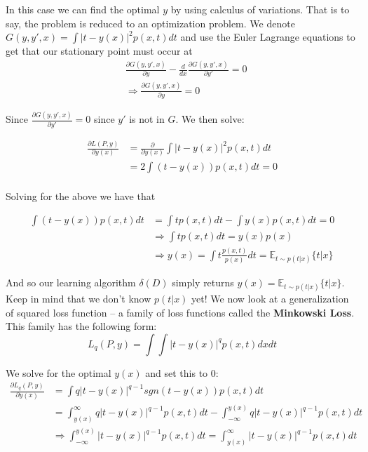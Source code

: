 \documentclass[]{article}
\theoremstyle{mattstyle}
\theoremstyle{definition}
\begin{document}
In this case we can find the optimal $y$ by using calculus of variations. That is to say, the problem is reduced to an optimization problem. We denote $G(y, y', x) = \int | t - y(x) |^2 p(x, t) dt$ and use the Euler Lagrange equations to get that our stationary point must occur at 
\begin{align*}
&\frac{\partial G(y, y', x)}{\partial y} - \frac{d}{dx}\frac{\partial G(y, y', x)}{\partial y'} = 0\\
&\Rightarrow \frac{\partial G(y, y', x)}{\partial y}=0
\end{align*}

Since $\frac{\partial G(y, y', x)}{\partial y'}=0$ since $y'$ is not in $G$. We then solve:

\begin{align*}
\frac{\partial L(P,y)}{\partial y(x)} &= \frac{\partial}{\partial y(x)}\int | t - y(x) |^2 p(x, t) dt\\
&=2 \int (t - y(x)) p(x, t) dt = 0\\
\end{align*}

Solving for the above we have that

\begin{align*}
\int (t - y(x)) p(x, t) dt &= \int t p(x, t) dt - \int y(x) p(x, t) dt = 0\\
&\Rightarrow \int t p(x, t) dt =  y(x)p(x) \\
&\Rightarrow y(x) = \int t \frac{p(x, t)}{p(x)} dt = \mathbb{E}_{t \sim p(t|x)}\{t|x\}
\end{align*}

And so our learning algorithm $\delta(D)$ simply returns $y(x) = \mathbb{E}_{t \sim p(t|x)}\{t|x\}$. Keep in mind that we don't know $p(t|x)$ yet! We now look at a generalization of squared loss function -- a family of loss functions called the \textbf{Minkowski Loss}. This family has the following form:
\begin{equation}
L_q(P,y) = \int\int |t-y(x)|^q p(x,t)dxdt
\end{equation}

We solve for the optimal $y(x)$ and set this to 0:
\begin{align}
\frac{\partial L_q(P,y)}{\partial y(x)} &= \int q|t-y(x)|^{q-1} sgn(t-y(x)) p(x,t)dt\\
&= \int_{y(x)}^{\infty} q|t-y(x)|^{q-1}p(x,t)dt-\int_{-\infty}^{y(x)} q|t-y(x)|^{q-1}p(x,t)dt\\
&\Rightarrow \int_{-\infty}^{y(x)} |t-y(x)|^{q-1}p(x,t)dt = \int_{y(x)}^{\infty} |t-y(x)|^{q-1}p(x,t)dt
\end{align}
\end{document}
